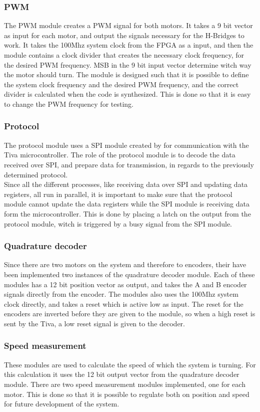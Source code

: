 \documentclass[../../../main]{subfiles}
\begin{document}
\subsubsection{PWM}
The PWM module creates a PWM signal for both motors. It takes a 9 bit vector as input for each motor, and output the signals necessary for the H-Bridges to work.
It takes the 100Mhz system clock from the FPGA as a input, and then the module contains a clock divider that creates the necessary clock frequency, for the desired PWM frequency.
MSB in the 9 bit input vector determine witch way the motor should turn.
The module is designed such that it is possible to define the system clock frequency and the desired PWM frequency, and the correct divider is calculated when the code is synthesized.
This is done so that it is easy to change the PWM frequency for testing.
\subsubsection{Protocol}
The protocol module uses a SPI module created by  for communication with the Tiva microcontroller. 
The role of the protocol module is to decode the data received over SPI, and prepare data for transmission, in regards to the previously determined protocol.
\\
Since all the different processes, like receiving data over SPI and updating data registers, all run in parallel, it is important to make sure that the protocol module cannot update the data registers while the SPI module is receiving data form the microcontroller.
This is done by placing a latch on the output from the protocol module, witch is triggered by a busy signal from the SPI module.

\subsubsection{Quadrature decoder}
Since there are two motors on the system and therefore to encoders, their have been implemented two instances of the quadrature decoder module.
Each of these modules has a 12 bit position vector as output, and takes the A and B encoder signals directly from the encoder. The modules also uses the 100Mhz system clock directly, and takes a reset which is active low as input.
The reset for the encoders are inverted before they are given to the module, so when a high reset is sent by the Tiva, a low reset signal is given to the decoder.


\subsubsection{Speed measurement}
These modules are used to calculate the speed of which the system is turning. For this calculation it uses the 12 bit output vector from the quadrature decoder module.
There are two speed measurement modules implemented, one for each motor.
This is done so that it is possible to regulate both on position and speed for future development of the system.
\end{document}
